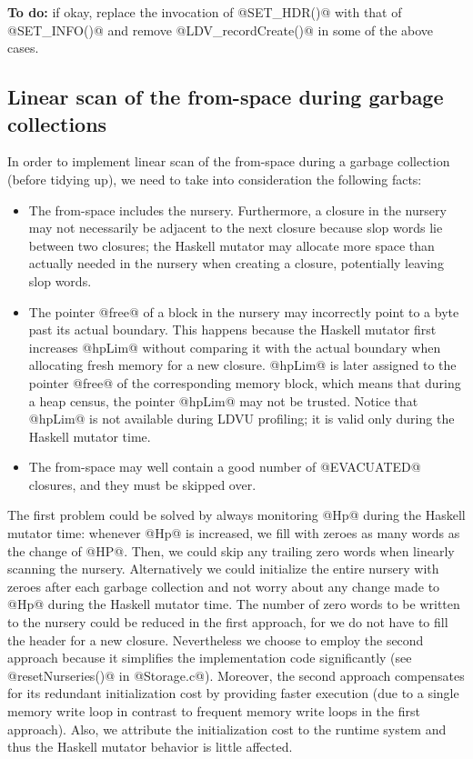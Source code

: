 \documentclass{article}
\begin{document}
\textbf{To do:} if okay, replace the invocation of @SET_HDR()@ with that of 
@SET_INFO()@ and remove @LDV_recordCreate()@ in some of the above cases. 

\subsection{Linear scan of the from-space during garbage collections}

In order to implement linear scan of the from-space during a garbage collection 
(before tidying up),
we need to take into consideration the following facts:

\begin{itemize}
\item The from-space includes the nursery. 
Furthermore, a closure in the nursery may not necessarily be adjacent to the next 
closure because slop words lie between two closures;
the Haskell mutator may allocate more space than actually needed in the
nursery when creating a closure, potentially leaving slop words. 

\item The pointer @free@ of a block in the nursery may incorrectly point to
a byte past its actual boundary.
This happens because 
the Haskell mutator first increases @hpLim@ without comparing it with the
actual boundary when allocating fresh memory for a new closure.
@hpLim@ is later assigned to the pointer @free@ of the corresponding memory
block, which means that during a heap census, the pointer @hpLim@ may not
be trusted. 
Notice that @hpLim@ is not available during LDVU profiling; it is valid
only during the Haskell mutator time.

\item The from-space may well contain a good number of @EVACUATED@ closures,
and they must be skipped over.
\end{itemize}

The first problem could be solved by always monitoring @Hp@ during the Haskell
mutator time: whenever @Hp@ is increased, we fill with zeroes 
as many words as the change of @HP@. Then, we could skip any trailing 
zero words when linearly scanning the nursery.
Alternatively we could initialize the entire nursery with zeroes after
each garbage collection and not worry about any change made to @Hp@ during the
Haskell mutator time. 
The number of zero words to be written to the nursery could be reduced
in the first approach, for we do not have to fill the header for a new closure.
Nevertheless we choose to employ the second approach because
it simplifies the implementation code significantly 
(see @resetNurseries()@ in @Storage.c@). 
Moreover, the second approach compensates for its redundant initialization cost
by providing faster execution (due to a single memory write loop in contrast
to frequent memory write loops in the first approach).
Also, we attribute the initialization cost to the runtime system and thus 
the Haskell mutator behavior is little affected. 
\end{document}
